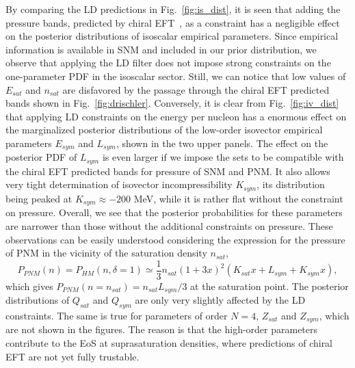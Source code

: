 By comparing the LD predictions in Fig.~\ref{fig:is_dist}, it is seen that 
adding the pressure bands, predicted by chiral EFT~\cite{Drischler2016}, as a 
constraint has a negligible effect on the posterior distributions of isoscalar
empirical parameters. Since empirical information is available in SNM and
included in our prior distribution, we observe that applying the LD filter 
does not impose strong constraints on the one-parameter PDF in the isoscalar 
sector. Still, we can notice that low values of $E_{sat}$ and $n_{sat}$ are 
disfavored by the passage through the chiral EFT predicted bands shown in 
Fig.~\ref{fig:drischler}. Conversely, it is clear from Fig.~\ref{fig:iv_dist} 
that applying LD constraints on the energy per nucleon has a enormous effect 
on the marginalized posterior distributions of the low-order isovector 
empirical parameters $E_{sym}$ and $L_{sym}$, shown in the two upper panels. 
The effect on the posterior PDF of $L_{sym}$ is even larger if we impose the 
sets to be compatible with the chiral EFT predicted bands for pressure of SNM 
and PNM. 
It also allows very tight determination of isovector incompressibility 
$K_{sym}$, its distribution being peaked at $K_{sym} \approx -200$ MeV, while 
it is rather flat without the constraint on pressure. Overall, 
we see that the posterior probabilities for these parameters are narrower
than those without the additional constraints on pressure. These observations 
can be easily understood considering the expression for the pressure 
of PNM in the vicinity of the saturation density $n_{sat}$,
%
\begin{equation}
  P_{PNM}(n) = P_{HM}(n,\delta=1) \simeq \frac{1}{3}n_{sat}(1+3x)^2(K_{sat}x +
    L_{sym} + K_{sym}x),
\end{equation}
%
which gives $P_{PNM}(n=n_{sat}) = n_{sat}L_{sym}/3$ at the saturation point. 
The posterior distributions of $Q_{sat}$ and $Q_{sym}$ are only very slightly  
affected by the LD constraints. The same is true for parameters of order $N=4$, 
$Z_{sat}$ and $Z_{sym}$, which are not shown in the figures. The reason is that
the high-order parameters contribute to the EoS at suprasaturation densities,
where predictions of chiral EFT are not yet fully trustable.

